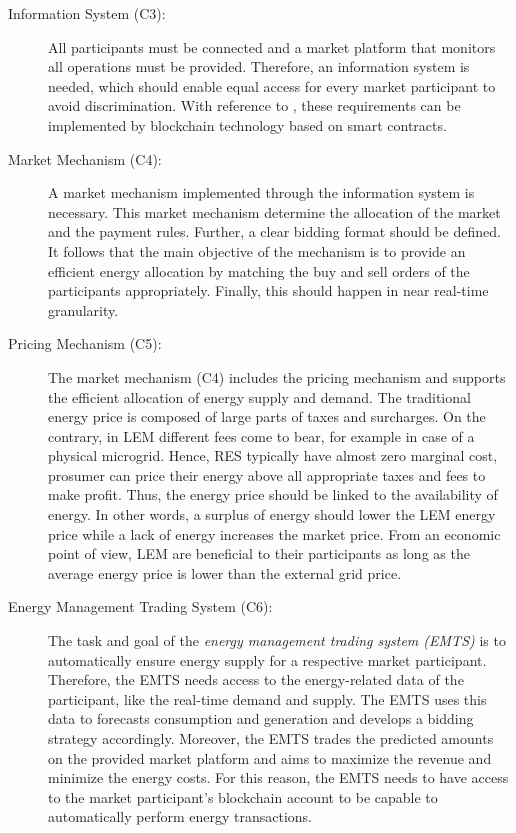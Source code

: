 \begin{description}
    \item[Information System (C3):] All participants must be connected 
    and a market platform that monitors all operations must be provided. 
    Therefore, an information system is needed, which should enable equal 
    access for every market participant to avoid discrimination. 
    With reference to , these requirements
    can be implemented by blockchain technology based on smart contracts.
    
    \item[Market Mechanism (C4):] A market mechanism implemented through 
     the information system is necessary. This market mechanism determine the allocation of the
     market and the payment rules. Further, a clear bidding format should be defined. 
     It follows that the main objective of the mechanism is to provide an efficient
     energy allocation by matching the buy and sell orders of the participants appropriately.
     Finally, this should happen in near real-time granularity.    
    
    \item[Pricing Mechanism (C5):] The market mechanism (C4) includes the pricing mechanism 
     and supports the efficient allocation of energy supply and demand. 
     The traditional energy price is composed of large parts of taxes and surcharges.
     On the contrary, in LEM different fees come to bear, for example in case of a 
     physical microgrid. Hence, RES typically have almost zero marginal cost, prosumer can 
     price their energy above all appropriate taxes and fees to make profit. 
    Thus, the energy price should be linked to the availability of energy. In other words,
    a surplus of energy should lower the LEM energy price while a lack of energy increases the 
    market price. From an economic point of view, LEM are beneficial to their 
    participants as long as the average energy price is lower than the external grid price.
        
    \item[Energy Management Trading System (C6):] The task and goal of the \textit{energy management trading system (EMTS)}
     is to automatically ensure energy supply for a respective market participant.
     Therefore, the EMTS needs access to the energy-related data of the participant, like 
     the real-time demand and supply. The EMTS uses this data to forecasts consumption and
     generation and develops a bidding strategy accordingly. 
     Moreover, the EMTS trades the predicted amounts on the provided market platform 
     and aims to maximize the revenue and minimize the energy costs. 
     For this reason, the EMTS needs to have access to the market participant’s
     blockchain account to be capable to automatically perform energy transactions.


\end{description}
